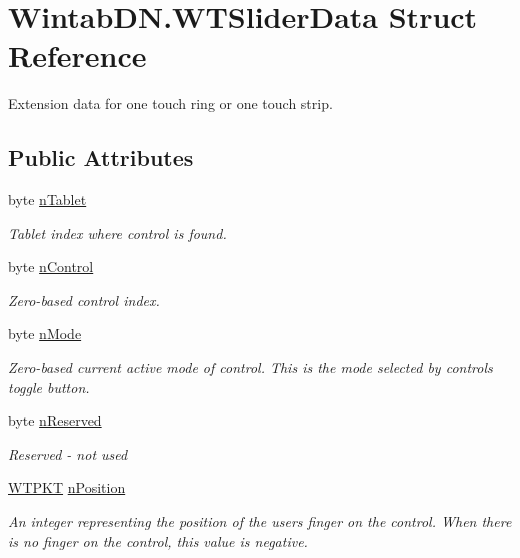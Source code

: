 \hypertarget{struct_wintab_d_n_1_1_w_t_slider_data}{}\section{Wintab\+D\+N.\+W\+T\+Slider\+Data Struct Reference}
\label{struct_wintab_d_n_1_1_w_t_slider_data}


Extension data for one touch ring or one touch strip.  


\subsection*{Public Attributes}
\begin{DoxyCompactItemize}
\item 
byte \mbox{\hyperlink{struct_wintab_d_n_1_1_w_t_slider_data_a2aab08d5288b117d39fd317776e43f6d}{n\+Tablet}}
\begin{DoxyCompactList}\small\item\em Tablet index where control is found. \end{DoxyCompactList}\item 
byte \mbox{\hyperlink{struct_wintab_d_n_1_1_w_t_slider_data_a67bce232a0f66ad5036c9bcfde214ab0}{n\+Control}}
\begin{DoxyCompactList}\small\item\em Zero-\/based control index. \end{DoxyCompactList}\item 
byte \mbox{\hyperlink{struct_wintab_d_n_1_1_w_t_slider_data_a6b7844a72b4ad2d80de3f41e34eb0670}{n\+Mode}}
\begin{DoxyCompactList}\small\item\em Zero-\/based current active mode of control. This is the mode selected by control\textquotesingle{}s toggle button. \end{DoxyCompactList}\item 
byte \mbox{\hyperlink{struct_wintab_d_n_1_1_w_t_slider_data_a2c95760e55826cc16272b70178222302}{n\+Reserved}}
\begin{DoxyCompactList}\small\item\em Reserved -\/ not used \end{DoxyCompactList}\item 
\mbox{\hyperlink{class_wintab_d_n_1_1_w_t_p_k_t}{W\+T\+P\+KT}} \mbox{\hyperlink{struct_wintab_d_n_1_1_w_t_slider_data_ae0f6633219aa174c8e6d42943eb3784f}{n\+Position}}
\begin{DoxyCompactList}\small\item\em An integer representing the position of the user\textquotesingle{}s finger on the control. When there is no finger on the control, this value is negative. \end{DoxyCompactList}\end{DoxyCompactItemize}


